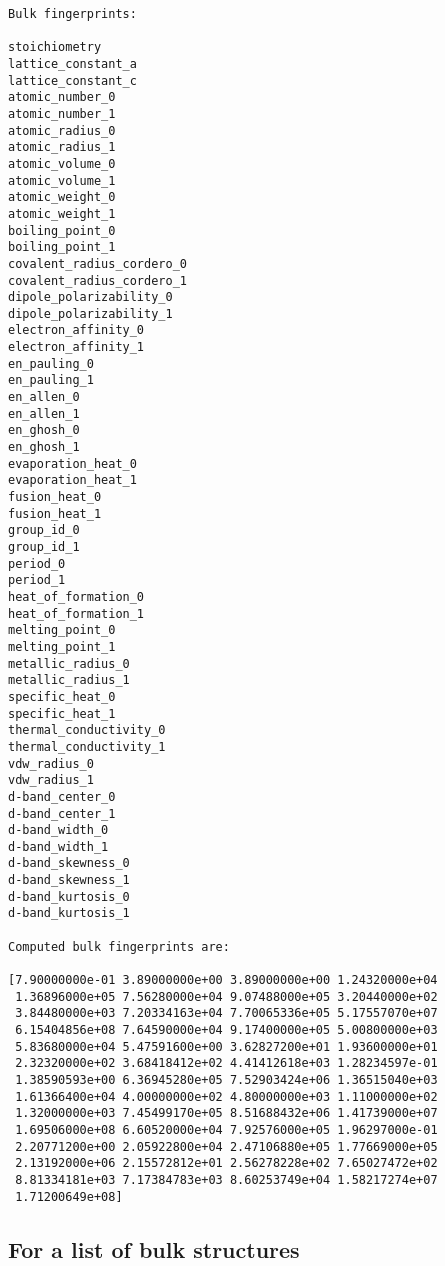 \documentclass[11pt]{article}
\begin{document}
\begin{verbatim}
Bulk fingerprints:

stoichiometry
lattice_constant_a
lattice_constant_c
atomic_number_0
atomic_number_1
atomic_radius_0
atomic_radius_1
atomic_volume_0
atomic_volume_1
atomic_weight_0
atomic_weight_1
boiling_point_0
boiling_point_1
covalent_radius_cordero_0
covalent_radius_cordero_1
dipole_polarizability_0
dipole_polarizability_1
electron_affinity_0
electron_affinity_1
en_pauling_0
en_pauling_1
en_allen_0
en_allen_1
en_ghosh_0
en_ghosh_1
evaporation_heat_0
evaporation_heat_1
fusion_heat_0
fusion_heat_1
group_id_0
group_id_1
period_0
period_1
heat_of_formation_0
heat_of_formation_1
melting_point_0
melting_point_1
metallic_radius_0
metallic_radius_1
specific_heat_0
specific_heat_1
thermal_conductivity_0
thermal_conductivity_1
vdw_radius_0
vdw_radius_1
d-band_center_0
d-band_center_1
d-band_width_0
d-band_width_1
d-band_skewness_0
d-band_skewness_1
d-band_kurtosis_0
d-band_kurtosis_1

Computed bulk fingerprints are:

[7.90000000e-01 3.89000000e+00 3.89000000e+00 1.24320000e+04
 1.36896000e+05 7.56280000e+04 9.07488000e+05 3.20440000e+02
 3.84480000e+03 7.20334163e+04 7.70065336e+05 5.17557070e+07
 6.15404856e+08 7.64590000e+04 9.17400000e+05 5.00800000e+03
 5.83680000e+04 5.47591600e+00 3.62827200e+01 1.93600000e+01
 2.32320000e+02 3.68418412e+02 4.41412618e+03 1.28234597e-01
 1.38590593e+00 6.36945280e+05 7.52903424e+06 1.36515040e+03
 1.61366400e+04 4.00000000e+02 4.80000000e+03 1.11000000e+02
 1.32000000e+03 7.45499170e+05 8.51688432e+06 1.41739000e+07
 1.69506000e+08 6.60520000e+04 7.92576000e+05 1.96297000e-01
 2.20771200e+00 2.05922800e+04 2.47106880e+05 1.77669000e+05
 2.13192000e+06 2.15572812e+01 2.56278228e+02 7.65027472e+02
 8.81334181e+03 7.17384783e+03 8.60253749e+04 1.58217274e+07
 1.71200649e+08]
\end{verbatim}

\subsection{For a list of bulk structures}
\label{sec:orgce38696}
\end{document}
